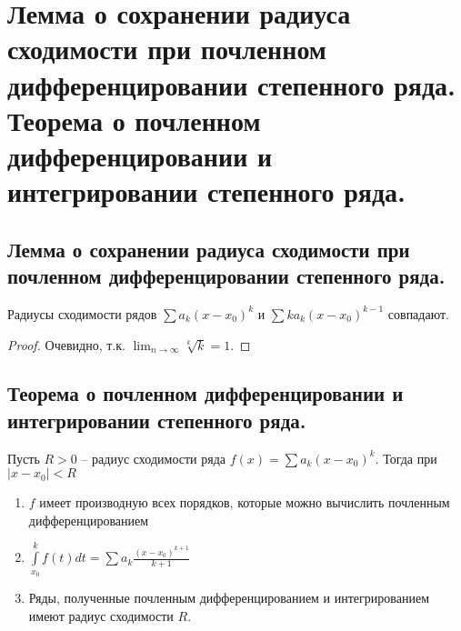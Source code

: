 \section{Лемма о сохранении радиуса сходимости при почленном дифференцировании степенного ряда. Теорема о почленном дифференцировании и интегрировании степенного ряда.}

\subsection{Лемма о сохранении радиуса сходимости при почленном дифференцировании степенного ряда.}
\begin{lemma}
    Радиусы сходимости рядов $\sum a_k (x - x_0)^k$ и $\sum k a_k (x - x_0)^{k-1}$ совпадают.
    \begin{proof}
        Очевидно, т.к. $\lim_{n \to \infty} \sqrt[k]{k} = 1$.
    \end{proof}
\end{lemma}

\subsection{Теорема о почленном дифференцировании и интегрировании степенного ряда.}
\begin{theorem}
    Пусть $R > 0$ -- радиус сходимости ряда $f(x) = \sum a_k (x - x_0)^k$. Тогда при $|x - x_0| < R$
    \begin{enumerate}
        \item $f$ имеет производную всех порядков, которые можно вычислить почленным дифференцированием
        \item $\int \limits_{x_0}^k f(t) dt = \sum a_k \frac{(x - x_0)^{k+1}}{k+1}$
        \item Ряды, полученные почленным дифференцированием и интегрированием имеют радиус сходимости $R$.
    \end{enumerate}
\end{theorem}